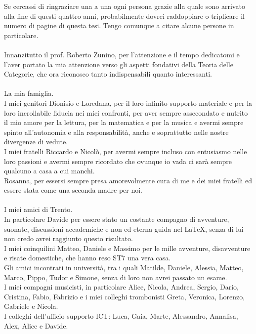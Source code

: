 \documentclass[openany]{book}
\begin{document}
Se cercassi di ringraziare una a una ogni persona grazie alla quale sono arrivato alla fine di questi quattro anni, probabilmente dovrei raddoppiare o triplicare il numero di pagine di questa tesi. Tengo comunque a citare alcune persone in particolare.\\
\\
Innanzitutto il prof. Roberto Zunino, per l'attenzione e il tempo dedicatomi e l'aver portato la mia attenzione verso gli aspetti fondativi della Teoria delle Categorie, che ora riconosco tanto indispensabili quanto interessanti.\\
\\
La mia famiglia.\\
I miei genitori Dionisio e Loredana, per il loro infinito supporto materiale e per la loro incrollabile fiducia nei miei confronti, per aver sempre assecondato e nutrito il mio amore per la lettura, per la matematica e per la musica e avermi sempre spinto all'autonomia e alla responsabilità, anche e soprattutto nelle nostre divergenze di vedute.\\
I miei fratelli Riccardo e Nicolò, per avermi sempre incluso con entusiasmo nelle loro passioni e avermi sempre ricordato che ovunque io vada ci sarà sempre qualcuno a casa a cui manchi.\\
Rosanna, per essersi sempre presa amorevolmente cura di me e dei miei fratelli ed essere stata come una seconda madre per noi.\\
\\
I miei amici di Trento.\\
In particolare Davide per essere stato un costante compagno di avventure, suonate, discussioni accademiche e non ed eterna guida nel \LaTeX , senza di lui non credo avrei raggiunto questo risultato.\\
I miei coinquilini Matteo, Daniele e Massimo per le mille avventure, disavventure e risate domestiche, che hanno reso ST7 una vera casa.\\
Gli amici incontrati in università, tra i quali Matilde, Daniele, Alessia, Matteo, Marco, Pippo, Tudor e Simone, senza di loro non avrei passato un esame.\\
I miei compagni musicisti, in particolare Alice, Nicola, Andrea, Sergio, Dario, Cristina, Fabio, Fabrizio e i miei colleghi trombonisti Greta, Veronica, Lorenzo, Gabriele e Nicola.\\
I colleghi dell'ufficio supporto ICT: Luca, Gaia, Marte, Alessandro, Annalisa, Alex, Alice e Davide.\\
\\
\end{document}
